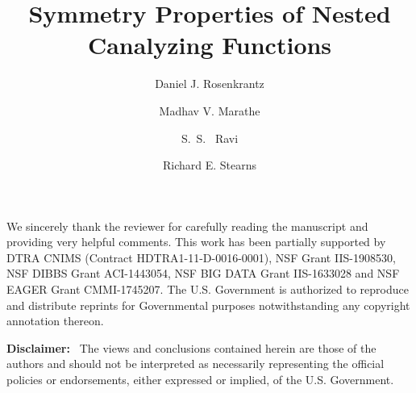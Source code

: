 \documentclass[
submission
]{dmtcs-episciences}
\author{Daniel J. Rosenkrantz\affiliationmark{1}
  \and Madhav V. Marathe\affiliationmark{2}%
  \and S.~S.~ Ravi\affiliationmark{1}%
  \and Richard E. Stearns\affiliationmark{1}
}
\title[Symmetry and NCFs]
      {Symmetry Properties of Nested Canalyzing Functions}
\affiliation{
  Biocomplexity Institute and Initiative, University of Virginia and
  Department of Computer Science, University at Albany 
  -- State University of New York, USA\\
  Biocomplexity Institute and Initiative \& Department of 
  Computer Science, University of Virginia, USA
}
\begin{document}
\maketitle




\newcommand{\QED}{\hfill\rule{2mm}{2mm}}

\newcommand{\cpoly}{\textbf{P}}
\newcommand{\cnp}{\textbf{NP}}
\newcommand{\cnump}{\textbf{\#P}}
\newcommand{\wtg}{\mbox{$\mathcal{G}$}}

\newcommand{\arr}{\mbox{$\:\longrightarrow\:$}}

\smallskip

\begin{abstract}

\end{abstract}






\acknowledgments
We sincerely thank the reviewer for carefully
reading the manuscript and providing very helpful comments.
This work has been partially supported by
DTRA CNIMS (Contract HDTRA1-11-D-0016-0001),
NSF Grant IIS-1908530, 
NSF DIBBS Grant ACI-1443054, 
NSF BIG DATA Grant IIS-1633028 and
NSF EAGER Grant CMMI-1745207.
The U.S. Government is authorized to reproduce and
distribute reprints for Governmental purposes notwithstanding
any copyright annotation thereon.

\bigskip%

\medskip

\noindent
\textbf{Disclaimer:}~ The views and conclusions contained
herein are those of the authors and should
not be interpreted as necessarily representing the
official policies or endorsements, either expressed
or implied, of the U.S. Government.



%

\end{document}
